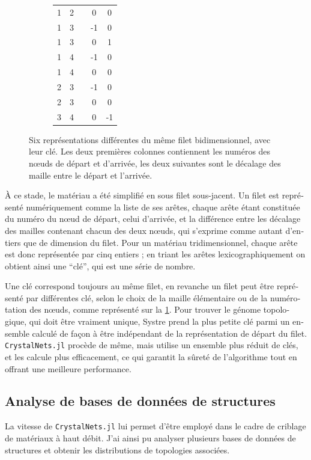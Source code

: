 \documentclass[thesis]{subfiles}
\begin{document}
\begin{otherlanguage}{french}
\begin{figure}[t]
\begin{subfigure}[b]{0.35\linewidth}
		\centering\scriptsize\begin{tabular}{ccccc}
			1&2&&0&0\\
			1&3&&-1&0\\
			1&3&&0&1\\
			1&4&&-1&0\\
			1&4&&0&0\\
			2&3&&-1&0\\
			2&3&&0&0\\
			3&4&&0&-1
		\end{tabular}
		\vspace{-0.5em}
	\end{subfigure}
	\vspace{2mm}
	\caption{Six représentations différentes du même filet bidimensionnel, avec leur clé. Les deux premières colonnes contiennent les numéros des n\oe uds de départ et d'arrivée, les deux suivantes sont le décalage des maille entre le départ et l'arrivée.} \label{fig_cles}
\end{figure}

À ce stade, le matériau a été simplifié en sous filet sous-jacent. Un filet est représenté numériquement comme la liste de ses arêtes, chaque arête étant constituée du numéro du n\oe ud de départ, celui d'arrivée, et la différence entre les décalage des mailles contenant chacun des deux n\oe uds, qui s'exprime comme autant d'entiers que de dimension du filet. Pour un matériau tridimensionnel, chaque arête est donc représentée par cinq entiers ; en triant les arêtes lexicographiquement on obtient ainsi une ``clé'', qui est une série de nombre.

Une clé correspond toujours au même filet, en revanche un filet peut être représenté par différentes clé, selon le choix de la maille élémentaire ou de la numérotation des n\oe uds, comme représenté sur la \cref{fig_cles}. Pour trouver le génome topologique, qui doit être vraiment unique, Systre prend la plus petite clé parmi un ensemble calculé de façon à être indépendant de la représentation de départ du filet. \texttt{CrystalNets.jl} procède de même, mais utilise un ensemble plus réduit de clés, et les calcule plus efficacement, ce qui garantit la sûreté de l'algorithme tout en offrant une meilleure performance.

\subsection{Analyse de bases de données de structures}

La vitesse de \texttt{CrystalNets.jl} lui permet d'être employé dans le cadre de criblage de matériaux à haut débit. J'ai ainsi pu analyser plusieurs bases de données de structures et obtenir les distributions de topologies associées.


\end{otherlanguage}
\end{document}
